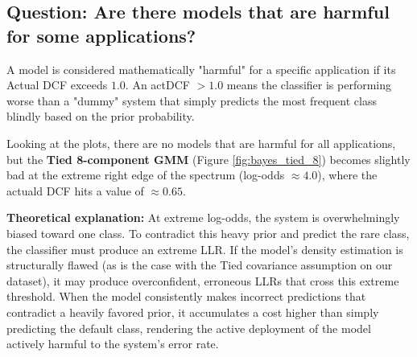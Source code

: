 \subsection*{Question: Are there models that are harmful for some applications?}

A model is considered mathematically "harmful" for a specific application if its Actual DCF exceeds $1.0$. An actDCF $> 1.0$ means the classifier is performing worse than a "dummy" system that simply predicts the most frequent class blindly based on the prior probability.

Looking at the plots, there are no models that are harmful for all applications, but the \textbf{Tied 8-component GMM} (Figure \ref{fig:bayes_tied_8}) becomes slightly bad at the extreme right edge of the spectrum (log-odds $\approx 4.0$), where the actuald DCF hits a value of $\approx 0.65$. 

\textbf{Theoretical explanation:} At extreme log-odds, the system is overwhelmingly biased toward one class. To contradict this heavy prior and predict the rare class, the classifier must produce an extreme LLR. If the model's density estimation is structurally flawed (as is the case with the Tied covariance assumption on our dataset), it may produce overconfident, erroneous LLRs that cross this extreme threshold. When the model consistently makes incorrect predictions that contradict a heavily favored prior, it accumulates a cost higher than simply predicting the default class, rendering the active deployment of the model actively harmful to the system's error rate.